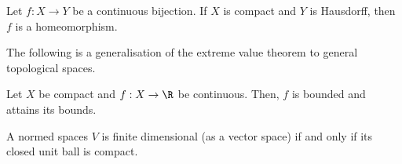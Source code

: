 \begin{nthm}
  Let $f: X \to Y$ be a continuous bijection. If $X$ is compact and $Y$ is Hausdorff, then $f$ is a homeomorphism.
\end{nthm}

The following is a generalisation of the extreme value theorem to general topological spaces.
\begin{nthm}
  Let $X$ be compact and $f: X \to \R$ be continuous. Then, $f$ is bounded and attains its bounds.
\end{nthm}

\begin{ndfn}
  A normed spaces $V$ is finite dimensional (as a vector space) if and only if its closed unit ball is compact.
\end{ndfn}